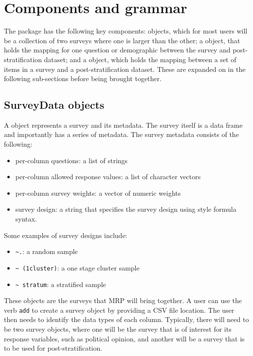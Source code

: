 \documentclass[
]{jss}
\providecommand{\tightlist}{%
  \setlength{\itemsep}{0pt}\setlength{\parskip}{0pt}}
\begin{document}
\section{Components and grammar} \label{sec:components}

The  package has the following key components:
 objects, which for most users will be a collection
of two surveys where one is larger than the other; a
 object, that holds the mapping for one
question or demographic between the survey and post-stratification
dataset; and a  object, which holds the mapping
between a set of items in a survey and a post-stratification dataset.
These are expanded on in the following sub-sections before being brought
together.

\subsection{SurveyData objects}

A  object represents a survey and its metadata. The
survey itself is a data frame and importantly has a series of metadata.
The survey metadata consists of the following:

\begin{itemize}
\tightlist
\item
  per-column questions: a list of strings
\item
  per-column allowed response values: a list of character vectors
\item
  per-column survey weights: a vector of numeric weights
\item
  survey design: a string that specifies the survey design using
   style formula syntax.
\end{itemize}

Some examples of survey designs include:

\begin{itemize}
\tightlist
\item
  \texttt{\textasciitilde{}.}: a random sample
\item
  \texttt{\textasciitilde{}\ (1\textbar{}cluster)}: a one stage cluster
  sample
\item
  \texttt{\textasciitilde{}\ stratum}: a stratified sample
\end{itemize}

These  objects are the surveys that MRP will bring
together. A user can use the verb \texttt{add} to create a survey object
by providing a CSV file location. The user then needs to identify the
data types of each column. Typically, there will need to be two survey
objects, where one will be the survey that is of interest for its
response variables, such as political opinion, and another will be a
survey that is to be used for post-stratification.
\end{document}
